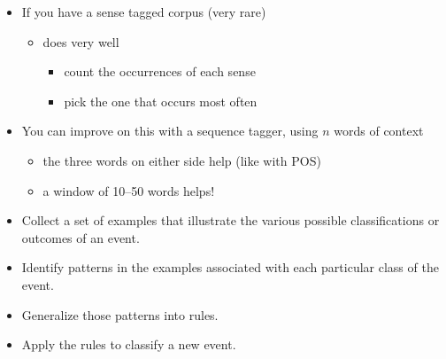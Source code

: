 \documentclass[a4paper,landscape,headrule,footrule,xetex]{foils}
\begin{document}



\begin{itemize}
\item If you have a sense tagged corpus (very rare)
  \begin{itemize}
  \item {} does very well
    \begin{itemize}
    \item count the occurrences of each sense
    \item pick the one that occurs most often
    \end{itemize}
  \end{itemize}
\item You can improve on this with a sequence tagger, using $n$ words of context
  \begin{itemize}
  \item the three words on either side help (like with POS)
  \item a window of 10--50 words helps! 
  \end{itemize}
\end{itemize}


\begin{itemize}
\item Collect a set of examples that illustrate the various possible classifications or outcomes of an event.
\item 
Identify patterns in the examples associated with each particular class of the event.
\item 
Generalize those patterns into rules.
\item 
Apply the rules to classify a new event.
\end{itemize}

\end{document}
